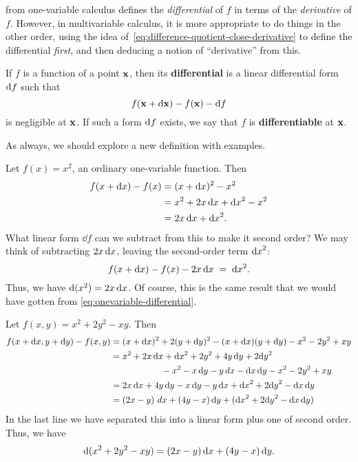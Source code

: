 \documentclass[12pt]{amsart}
\begin{document}
 from one-variable calculus defines the \emph{differential} of $f$ in terms of the \emph{derivative} of $f$.
However, in multivariable calculus, it is more appropriate to do things in the other order, using the idea of~\cref{eq:difference-quotient-close-derivative} to define the differential \emph{first}, and then deducing a notion of ``derivative'' from this.

\begin{defn}\label{def:differential}
  If $f$ is a function of a point $\mathbf{x}$, then its \textbf{differential} is a linear differential form ${\mathrm{d} f}$ such that
  \[ f(\mathbf{x} + \mathrm{d}\mathbf{x}) - f(\mathbf{x}) - {\mathrm{d} f} \]
  is negligible at $\mathbf{x}$.
  If such a form ${\mathrm{d} f}$ exists, we say that $f$ is \textbf{differentiable} at $\mathbf{x}$.
\end{defn}

As always, we should explore a new definition with examples.

\begin{eg}
  Let $f(x) = x^2$, an ordinary one-variable function.
  Then
  \begin{align*}
    f(x + {\mathrm{d} x}) - f(x) &= (x+{\mathrm{d} x})^2 - x^2\\
    &= x^2 + 2 x \, {\mathrm{d} x} + {\mathrm{d} x}^2 - x^2\\
    &= 2x \, {\mathrm{d} x} + {\mathrm{d} x} ^2.
  \end{align*}
  What linear form $\dd f$ can we subtract from this to make it second order?
  We may think of subtracting $2x \, {\mathrm{d} x}$, leaving the second-order term ${\mathrm{d} x}^2$:
  \[ f(x + {\mathrm{d} x}) - f(x) - 2x \, {\mathrm{d} x} \;=\; {\mathrm{d} x}^2. \]
  Thus, we have $\mathrm{d}(x^2) = 2 x \, {\mathrm{d} x}$.
  Of course, this is the same result that we would have gotten from \cref{eq:onevariable-differential}.
\end{eg}

\begin{eg}
  Let $f(x,y) = x^2 + 2y^2 - xy$.
  Then
  \begin{align*}
    f(x+{\mathrm{d} x},y+{\mathrm{d} y}) - f(x,y)
    &= (x+{\mathrm{d} x})^2 + 2(y+{\mathrm{d} y})^2 - (x+{\mathrm{d} x})(y+{\mathrm{d} y}) - x^2 - 2y^2 + xy\\
    &= x^2 + 2 x \, {\mathrm{d} x} + {\mathrm{d} x}^2 + 2y^2 + 4y\,{\mathrm{d} y} + 2{\mathrm{d} y}^2\\
    & \hspace{2cm} - x^2 - x \, {\mathrm{d} y} - y \, dx - {\mathrm{d} x}\, {\mathrm{d} y} - x^2 - 2y^2 + xy\\
    &= 2x\,{\mathrm{d} x} + 4y\,{\mathrm{d} y} - x\,{\mathrm{d} y} - y\,{\mathrm{d} x} + {\mathrm{d} x}^2 + 2{\mathrm{d} y}^2 - {\mathrm{d} x}\,{\mathrm{d} y}\\
    &= (2x-y)\,\,dx + (4y-x)\,{\mathrm{d} y} + ({\mathrm{d} x}^2 + 2{\mathrm{d} y}^2 - {\mathrm{d} x}\,{\mathrm{d} y})
  \end{align*}
  In the last line we have separated this into a linear form plus one of second order.
  Thus, we have
  \[ \mathrm{d}(x^2 + 2y^2 - xy) = (2x-y)\,{\mathrm{d} x} + (4y-x)\,{\mathrm{d} y} .\]
\end{eg}
\end{document}
